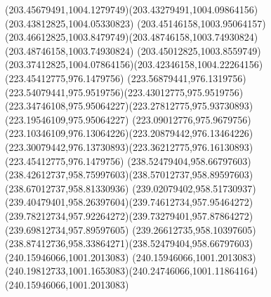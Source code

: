 {{\curveto(203.45679491,1004.1279749)(203.43279491,1004.09864156)(203.43812825,1004.05330823)
\curveto(203.45146158,1003.95064157)(203.46612825,1003.8479749)(203.48746158,1003.74930824)
\lineto(203.48746158,1003.74930824)
\curveto(203.45012825,1003.8559749)(203.37412825,1004.07864156)(203.42346158,1004.22264156)
\moveto(223.45412775,976.1479756)
\curveto(223.56879441,976.1319756)(223.54079441,975.9519756)(223.43012775,975.9519756)
\curveto(223.34746108,975.95064227)(223.27812775,975.93730893)(223.19546109,975.95064227)
\curveto(223.09012776,975.9679756)(223.10346109,976.13064226)(223.20879442,976.13464226)
\curveto(223.30079442,976.13730893)(223.36212775,976.16130893)(223.45412775,976.1479756)
\moveto(238.52479404,958.66797603)
\curveto(238.42612737,958.75997603)(238.57012737,958.89597603)(238.67012737,958.81330936)
\curveto(239.02079402,958.51730937)(239.40479401,958.26397604)(239.74612734,957.95464272)
\curveto(239.78212734,957.92264272)(239.73279401,957.87864272)(239.69812734,957.89597605)
\curveto(239.26612735,958.10397605)(238.87412736,958.33864271)(238.52479404,958.66797603)
\moveto(240.15946066,1001.2013083)
\lineto(240.15946066,1001.2013083)
\curveto(240.19812733,1001.1653083)(240.24746066,1001.11864164)(240.15946066,1001.2013083)
}
}
{
}
{
}
